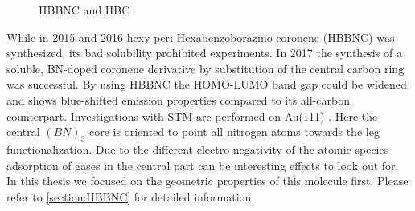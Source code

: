 \begin{figure}[]\centering
	 \quad
	 \quad
	\caption{ HBBNC and  HBC}
	\label{fig:HBBNC+HBC}
\end{figure}

While in 2015\cite{Krieg_construction_2015} and 2016 \cite{Ciccullo_Quasi-Free-Standing_2016} hexy-peri-Hexabenzoborazino coronene (HBBNC) was synthesized, its bad solubility prohibited experiments. In 2017 the synthesis \cite{dosso_synthesis_2017} of a soluble, BN-doped coronene derivative by substitution of the central carbon ring was successful. By using HBBNC the HOMO-LUMO band gap could be widened and shows blue-shifted emission properties\cite{dosso_synthesis_2017} compared to its all-carbon counterpart. Investigations with STM are performed on Au(111) \cite{Krieg_construction_2015}.
Here the central $(BN)_3$ core is oriented to point all nitrogen atoms towards the leg functionalization.
Due to the different electro negativity of the atomic species adsorption of gases in the central part can be interesting effects to look out for. In this thesis we focused on the geometric properties of this molecule first. Please refer to \autoref{section:HBBNC} for detailed information.